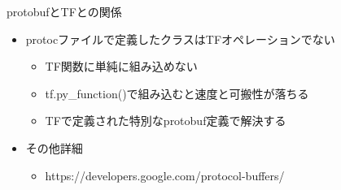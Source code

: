 \documentclass[aspectratio=169, dvipdfmx, 14pt, xcolor={svgnames,dvipsnames}, t]{beamer}
\begin{document}

\begin{frame}{protobufとTFとの関係}

  \begin{itemize}
    \tightlist
    \item
          \alert{protocファイルで定義したクラスはTFオペレーションでない}

          \begin{itemize}
            \tightlist
            \item
                  TF関数に単純に組み込めない
            \item
                  tf.py\_function()で組み込むと速度と可搬性が落ちる
            \item
                  TFで定義された特別なprotobuf定義で解決する
          \end{itemize}
    \item
          その他詳細

          \begin{itemize}
            \tightlist
            \item
                  https://developers.google.com/protocol-buffers/
          \end{itemize}
  \end{itemize}

\end{frame}

\end{document}
